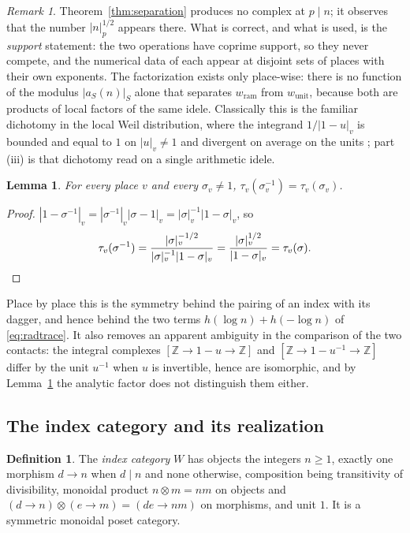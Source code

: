 \documentclass[11pt]{amsart}
\newtheorem{lemma}[theorem]{Lemma}
\theoremstyle{definition}
\newtheorem{definition}[theorem]{Definition}
\theoremstyle{remark}
\newtheorem{remark}[theorem]{Remark}
\newcommand{\Z}{\mathbb Z}
\begin{document}
\begin{remark}\label{rem:whatsep}
Theorem~\ref{thm:separation} produces no complex at $p\mid n$; it observes that
the number $|n|_p^{1/2}$ appears there. What is correct, and what is used, is
the \emph{support} statement: the two operations have coprime support, so they
never compete, and the numerical data of each appear at disjoint sets of places
with their own exponents. The factorization exists only place-wise: there is no
function of the modulus $|a_S(n)|_S$ alone that separates $w_{\mathrm{ram}}$
from $w_{\mathrm{unit}}$, because both are products of local factors of the
same idele. Classically this is the familiar dichotomy in the local Weil
distribution, where the integrand $1/|1-u|_v$ is bounded and equal to $1$ on
$|u|_v\ne1$ and divergent on average on the units \cite{Weil1952}; part (iii)
is that dichotomy read on a single arithmetic idele.
\end{remark}

\begin{lemma}\label{lem:tauinv}
For every place $v$ and every $\sigma_v\ne1$, $\tau_v(\sigma_v^{-1})
=\tau_v(\sigma_v)$.
\end{lemma}

\begin{proof}
$|1-\sigma^{-1}|_v=|\sigma^{-1}|_v|\sigma-1|_v=|\sigma|_v^{-1}|1-\sigma|_v$, so
\[
  \tau_v(\sigma^{-1})=\frac{|\sigma|_v^{-1/2}}{|\sigma|_v^{-1}|1-\sigma|_v}
   =\frac{|\sigma|_v^{1/2}}{|1-\sigma|_v}=\tau_v(\sigma). \qedhere
\]
\end{proof}

Place by place this is the symmetry behind the pairing of an index with its
dagger, and hence behind the two terms $h(\log n)+h(-\log n)$ of
\eqref{eq:radtrace}. It also removes an apparent ambiguity in the comparison of
the two contacts: the integral complexes $[\Z\to1-u\to\Z]$ and
$[\Z\to1-u^{-1}\to\Z]$ differ by the unit $u^{-1}$ when $u$ is invertible, hence
are isomorphic, and by Lemma~\ref{lem:tauinv} the analytic factor does not
distinguish them either.

\subsection{The index category and its realization}

\begin{definition}\label{def:indexcat}
The \emph{index category} $W$ has objects the integers $n\ge1$, exactly one
morphism $d\to n$ when $d\mid n$ and none otherwise, composition being
transitivity of divisibility, monoidal product $n\otimes m=nm$ on objects and
$(d\to n)\otimes(e\to m)=(de\to nm)$ on morphisms, and unit $1$. It is a
symmetric monoidal poset category.
\end{definition}
\end{document}
